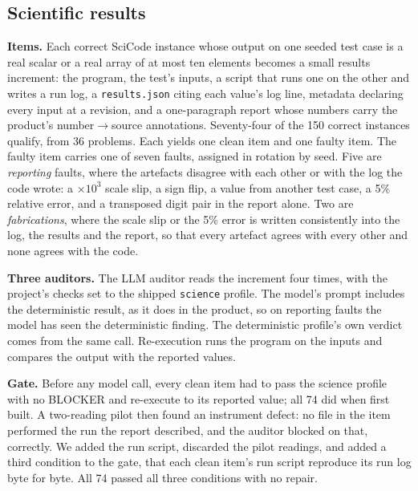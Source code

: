 \subsection{Scientific results}
\label{sec:ai4s-results-full}

\textbf{Items.} Each correct SciCode instance whose output on one seeded test case is a real
scalar or a real array of at most ten elements becomes a small results increment: the program, the
test's inputs, a script that runs one on the other and writes a run log, a \texttt{results.json}
citing each value's log line, metadata declaring every input at a revision, and a one-paragraph
report whose numbers carry the product's number$\to$source annotations. Seventy-four of the 150
correct instances qualify, from 36 problems. Each yields one clean item and one faulty item. The
faulty item carries one of seven faults, assigned in rotation by seed. Five are \emph{reporting}
faults, where the artefacts disagree with each other or with the log the code wrote: a $\times
10^{3}$ scale slip, a sign flip, a value from another test case, a 5\% relative error, and a
transposed digit pair in the report alone. Two are \emph{fabrications}, where the scale slip or the
5\% error is written consistently into the log, the results and the report, so that every artefact
agrees with every other and none agrees with the code.

\textbf{Three auditors.} The LLM auditor reads the increment four times, with the project's checks
set to the shipped \texttt{science} profile. The model's prompt includes the deterministic
result, as it does in the product, so on reporting faults the model has seen the deterministic
finding. The deterministic profile's own verdict comes from the same call. Re-execution runs the
program on the inputs and compares the output with the reported values.

\textbf{Gate.} Before any model call, every clean item had to pass the science profile with no
BLOCKER and re-execute to its reported value; all 74 did when first built. A two-reading pilot then
found an instrument defect: no file in the item performed the run the report described, and the
auditor blocked on that, correctly. We added the run script, discarded the pilot readings, and
added a third condition to the gate, that each clean item's run script reproduce its run log byte
for byte. All 74 passed all three conditions with no repair.

